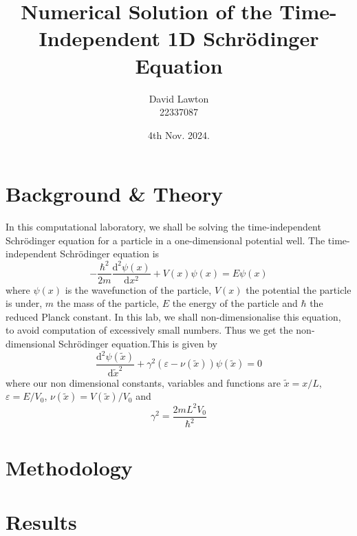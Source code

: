 \documentclass{article}
\title{Numerical Solution of the Time-Independent 1D Schr\"{o}dinger Equation}
\author{David Lawton\\
        22337087}
\date{4th Nov. 2024.}
\theoremstyle{definition}
\theoremstyle{remark}
\begin{document}
\maketitle

\tableofcontents
{}
\begin{abstract}

\end{abstract}

\section{Background \& Theory}
In this computational laboratory, we shall be solving the time-independent Schr\"{o}dinger equation for a particle in a one-dimensional potential well. The time-independent Schr\"{o}dinger equation is 
\begin{equation}
    -\frac{\hbar^2}{2m}\frac{\mathrm{d}^2\psi(x)}{\mathrm{d}x^2} + V(x)\psi(x) = E\psi(x)
\end{equation}
where $\psi(x)$ is the wavefunction of the particle, $V(x)$ the potential the particle is under, $m$ the mass of the particle, $E$ the energy of the particle and $\hbar$ the reduced Planck constant. In this lab, we shall non-dimensionalise this equation, to avoid computation of excessively small numbers. Thus we get the non-dimensional Schr\"{o}dinger equation.This is given by
\begin{equation}
    \frac{\mathrm{d}^2\psi(\tilde{x})}{\mathrm{d}\tilde{x}^2} + \gamma^2(\varepsilon-\nu(\tilde{x}))\psi(\tilde{x}) = 0
\end{equation}
where our non dimensional constants, variables and functions are $\tilde{x} = x/L$, $\varepsilon = E/V_0$, $\nu(\tilde{x}) = V(\tilde{x})/V_0$ and 
\begin{equation}
    \gamma^2 = \frac{2mL^2V_0}{\hbar^2}
\end{equation}
\section{Methodology}

\section{Results}
\end{document}
